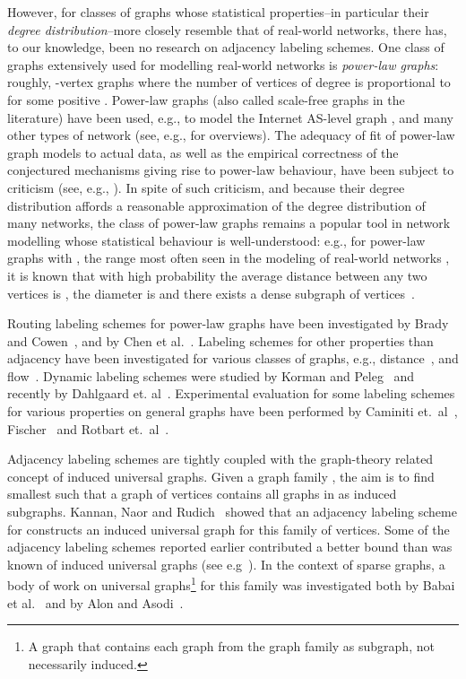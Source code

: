 \documentclass{article}
\theoremstyle{remark}
\begin{document}
However, for classes of graphs whose statistical properties--in particular their \emph{degree distribution}--more closely resemble that of real-world networks, there has, to our knowledge, been no research on adjacency labeling schemes.
One class of graphs extensively used for modelling real-world networks is \emph{power-law graphs}: roughly, -vertex graphs where the number of vertices of degree  is proportional to  for some positive . Power-law graphs (also called scale-free graphs in the literature) have been used, e.g., to model the Internet AS-level graph \cite{DBLP:journals/ton/SiganosFFF03,DBLP:conf/podc/AkellaCKS03}, and many other types of network (see, e.g., \cite{mitzenmacher2004brief,clauset2009power} for overviews). 
The adequacy of fit of power-law graph models to actual data, as well as the empirical correctness of the conjectured mechanisms giving rise to power-law behaviour, have been subject to criticism (see, e.g., \cite{DBLP:journals/jacm/AchlioptasCKM09,clauset2009power}). 
In spite of such criticism, and because their degree distribution affords a reasonable approximation of the degree distribution of many networks, the class of power-law graphs remains a popular tool in network modelling whose statistical behaviour is well-understood: e.g., for power-law graphs with , the range most often seen in the modeling of real-world networks \cite{clauset2009power}, it is known that with high probability the average distance between any two vertices is  , the diameter is  and there exists a dense subgraph of  vertices~\cite{chung2004average}. 

Routing labeling schemes for power-law graphs  have been investigated by Brady and Cowen~\cite{brady2006compact}, and by Chen et al.~\cite{chen2012compact}. Labeling schemes for other properties than adjacency have been investigated for various classes of graphs, e.g., distance~\cite{gavoillea2004distance}, and flow~\cite{katz2004labeling}. 
Dynamic labeling schemes were studied by Korman and Peleg~\cite{korman2007compact,Korman07,korman2007general} and recently by Dahlgaard et. al~\cite{dahlgaard2014dynamic}.
Experimental evaluation for some labeling schemes for various properties on general graphs have been performed by Caminiti et.~al~\cite{caminiti2008engineering}, Fischer~\cite{fischer2009short} and Rotbart et.~al~\cite{rotbart2014evaluation}.

Adjacency labeling schemes are tightly coupled with  the graph-theory related concept of induced universal graphs.
Given a  graph family  , the aim  is to find smallest  such that a graph of   vertices contains all graphs in  as induced subgraphs. 
Kannan, Naor and Rudich~\cite{Kannan92} showed that an  adjacency labeling scheme for   constructs an induced universal graph for this family of   vertices. Some  of the adjacency labeling schemes reported earlier  contributed a better bound than was known of  induced universal graphs (see e.g~\cite{BCLR,Alstrup02}).
In the context of  sparse graphs,  a body of work on universal graphs\footnote{A graph that  contains each graph from the graph family as subgraph, not necessarily induced.} for this family was  investigated both by  Babai et al.~\cite{babai1982graphs} and  by Alon and Asodi~\cite{Alon2002universal}. 
\end{document}
